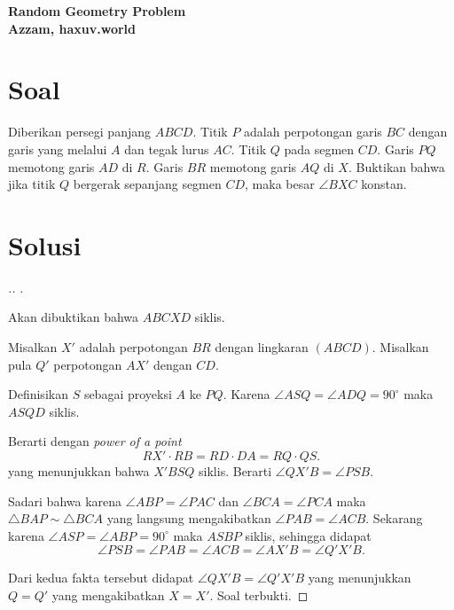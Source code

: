\begin{center}
    \textbf{\Huge Random Geometry Problem}\\
    \textbf{\large Azzam, haxuv.world}
\end{center}


\section{Soal}
Diberikan persegi panjang $ABCD$. Titik $P$ adalah perpotongan garis $BC$ dengan garis yang melalui $A$ dan tegak lurus $AC$. Titik $Q$ pada segmen $CD$. Garis $PQ$ memotong garis $AD$ di $R$. Garis $BR$ memotong garis $AQ$ di $X$. Buktikan bahwa jika titik $Q$ bergerak sepanjang segmen $CD$, maka besar $\angle BXC$ konstan.

\newpage
\section{Solusi}
\begin{proof}[.] 
.

Akan dibuktikan bahwa $ABCXD$ siklis. 

Misalkan $X'$ adalah perpotongan $BR$ dengan lingkaran $(ABCD)$. Misalkan pula $Q'$ perpotongan $AX'$ dengan $CD$.

Definisikan $S$ sebagai proyeksi $A$ ke $PQ$. Karena $\angle ASQ = \angle ADQ = 90^\circ$ maka $ASQD$ siklis.

Berarti dengan \textit{power of a point}
$$RX'\cdot RB = RD\cdot DA = RQ\cdot QS.$$
yang menunjukkan bahwa $X'BSQ$ siklis. Berarti $\angle QX'B = \angle PSB$.

Sadari bahwa karena $\angle ABP = \angle PAC$ dan $\angle BCA = \angle PCA$ maka $\triangle BAP \sim \triangle BCA$ yang langsung mengakibatkan $\angle PAB = \angle ACB$.
Sekarang karena $\angle ASP = \angle ABP = 90^\circ$ maka $ASBP$ siklis, sehingga didapat $$\angle PSB = \angle PAB = \angle ACB = \angle AX'B = \angle Q'X'B.$$

Dari kedua fakta tersebut didapat $\angle QX'B = \angle Q'X'B$ yang menunjukkan $Q = Q'$ yang mengakibatkan $X = X'$. Soal terbukti.
\end{proof}
